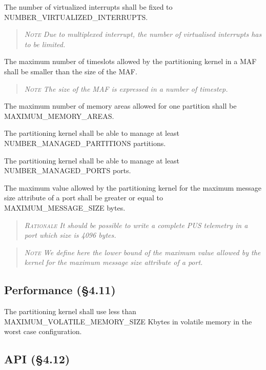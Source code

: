 The number of virtualized interrupts shall be fixed to NUMBER\_VIRTUALIZED\_INTERRUPTS.
\begin{quote}\it
\textsc{Note}
Due to multiplexed interrupt, the number of virtualised interrupts has to be limited.
\end{quote}

The maximum number of timeslots allowed by the partitioning kernel in a MAF shall be smaller than the size of the MAF.
\begin{quote}\it
\textsc{Note}
The size of the MAF is expressed in a number of timestep.
\end{quote}

The maximum number of memory areas allowed for one partition shall be MAXIMUM\_MEMORY\_AREAS.

The partitioning kernel shall be able to manage at least NUMBER\_MANAGED\_PARTITIONS partitions.

The partitioning kernel shall be able to manage at least NUMBER\_MANAGED\_PORTS ports.

The maximum value allowed by the partitioning kernel for the maximum message size attribute of a port shall be greater or equal to MAXIMUM\_MESSAGE\_SIZE bytes.
\begin{quote}\it
\textsc{Rationale}
It should be possible to write a complete PUS telemetry in a port which size is 4096 bytes.
\end{quote}
\begin{quote}\it
\textsc{Note}
We define here the lower bound of the maximum value allowed by the kernel for the maximum message size attribute of a port.
\end{quote}

\subsection{Performance (\S4.11)}

The partitioning kernel shall use less than MAXIMUM\_VOLATILE\_MEMORY\_SIZE Kbytes in volatile memory in the worst case configuration.

\subsection{API (\S4.12)}

